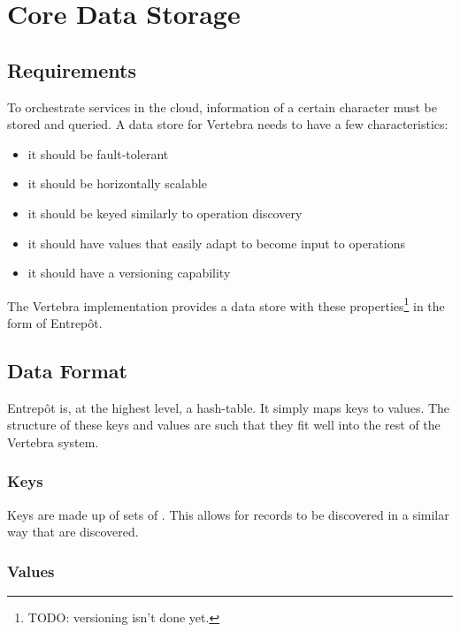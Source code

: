 \section{Core Data Storage}

\subsection{Requirements}

\label{ref:core-data-storage}To orchestrate services in the cloud, information of a certain character must be stored and queried.  A data store for Vertebra needs to have a few characteristics:

\begin{itemize}
        \item it should be fault-tolerant
        \item it should be horizontally scalable
        \item it should be keyed similarly to operation discovery
        \item it should have values that easily adapt to become input to operations
        \item it should have a versioning capability
\end{itemize}

The Vertebra implementation provides a data store with these properties\footnote{TODO: versioning isn't done yet.} in the form of Entrep\^ot.

\subsection{Data Format}

Entrep\^ot is, at the highest level, a hash-table.  It simply maps keys to values.  The structure of these keys and values are such that they fit well into the rest of the Vertebra system.

\subsubsection{Keys}

Keys are made up of sets of \resources{}.  This allows for records to be discovered in a similar way that \agents{} are discovered.

\subsubsection{Values}

